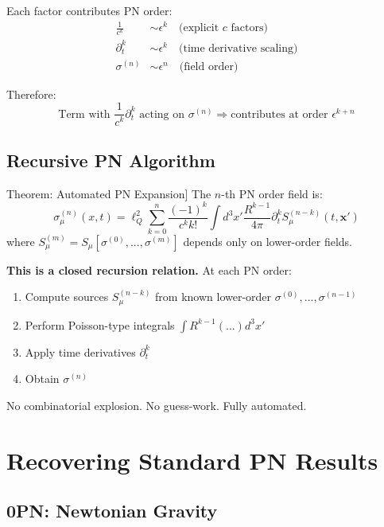 \documentclass[11pt,a4paper]{article}
\theoremstyle{definition}
\theoremstyle{remark}
\begin{document}
		Each factor contributes PN order:
		\begin{align}
			\frac{1}{c^k} &\sim \epsilon^k \quad \text{(explicit $c$ factors)}\\
			\partial_t^k &\sim \epsilon^k \quad \text{(time derivative scaling)}\\
			\sigma^{(n)} &\sim \epsilon^n \quad \text{(field order)}
		\end{align}
		
		Therefore:
		\begin{equation}
			\text{Term with } \frac{1}{c^k}\partial_t^k \text{ acting on } \sigma^{(n)} \Rightarrow \text{contributes at order } \epsilon^{k+n}
		\end{equation}
		
		\subsection{Recursive PN Algorithm}
		
		Theorem: Automated PN Expansion]
			The $n$-th PN order field is:
			\begin{equation}\label{eq:PN_recursion}
				\boxed{\sigma_\mu^{(n)}(x,t) = \ell_Q^2\sum_{k=0}^n\frac{(-1)^k}{c^k k!}\int d^3x'\frac{R^{k-1}}{4\pi}\partial_t^k S_\mu^{(n-k)}(t,\mathbf{x}')}
			\end{equation}
			where $S_\mu^{(m)} = S_\mu[\sigma^{(0)}, ..., \sigma^{(m)}]$ depends only on lower-order fields.
		
		\textbf{This is a closed recursion relation.} At each PN order:
		\begin{enumerate}
			\item Compute sources $S_\mu^{(n-k)}$ from known lower-order $\sigma^{(0)}, ..., \sigma^{(n-1)}$
			\item Perform Poisson-type integrals $\int R^{k-1}(...)d^3x'$
			\item Apply time derivatives $\partial_t^k$
			\item Obtain $\sigma^{(n)}$
		\end{enumerate}
		
		No combinatorial explosion. No guess-work. Fully automated.
		
		\section{Recovering Standard PN Results}
		
		\subsection{0PN: Newtonian Gravity}
		
\end{document}
